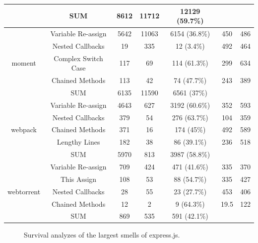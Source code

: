 {\begin{table}[!htbp]
\begin{tabular}{c|c|c|c|c|c|c}
		& SUM & 8612 & 11712 & 12129 (59.7\%) & & \\ \hline
		\multirow{5}{*}{moment}
		& Variable Re-assign & 5642 & 11063 & 6154 (36.8\%) & 450 & 486 \\ \cline{2-7}
		& Nested Callbacks & 19 & 335 & 12 (3.4\%) & 492 & 464 \\ \cline{2-7}
		& Complex Switch Case & 117 & 69 & 114 (61.3\%) & 299 & 634 \\ \cline{2-7}
		& Chained Methods & 113 & 42 & 74 (47.7\%) & 243 & 389 \\ \cline{2-7}
		& SUM & 6135 & 11590 & 6561 (37\%) & & \\ \hline
		\multirow{5}{*}{webpack}
		& Variable Re-assign & 4643 & 627 & 3192 (60.6\%) & 352 & 593 \\ \cline{2-7}
		& Nested Callbacks & 379 & 54 & 276 (63.7\%) & 104 & 359 \\ \cline{2-7}
		& Chained Methods & 371 & 16 & 174 (45\%) & 492 & 589 \\ \cline{2-7}
		& Lengthy Lines & 182 & 38 & 86 (39.1\%) & 236 & 518 \\ \cline{2-7}
		& SUM & 5970 & 813 & 3987 (58.8\%) & & \\ \hline
		\multirow{5}{*}{webtorrent}
		& Variable Re-assign & 709 & 424 & 471 (41.6\%) & 335 & 370 \\ \cline{2-7}
		& This Assign & 108 & 53 & 88 (54.7\%) & 335 & 427 \\ \cline{2-7}
		& Nested Callbacks & 28 & 55 & 23 (27.7\%) & 453 & 406 \\ \cline{2-7}
		& Chained Methods & 12 & 2 & 9 (64.3\%) & 19.5 & 122 \\ \cline{2-7}
		& SUM & 869 & 535 & 591 (42.1\%) & & \\ \hline
	\end{tabular}
	\label{survivalsmells}
\end{table}

\begin{figure}[!htbp]
	\centering%
	\caption{Survival analyzes of the largest smells of express.js.\vspace{-10pt}}
	\label{survivalplots1}
\end{figure}

}

